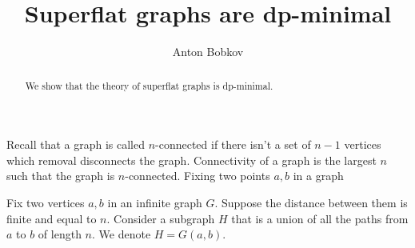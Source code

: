 \documentclass{amsart}
\begin{document}
\title{Superflat graphs are dp-minimal}
\author{Anton Bobkov}

\begin{abstract}
	We show that the theory of superflat graphs is dp-minimal.
\end{abstract}

\maketitle

Recall that a graph is called $n$-connected if there isn't a set of $n-1$ vertices which removal disconnects the graph. Connectivity of a graph is the largest $n$ such that the graph is $n$-connected. Fixing two points $a,b$ in a graph

\begin{Definition}
	Fix two vertices $a,b$ in an infinite graph $G$. Suppose the distance between them is finite and equal to $n$. Consider a subgraph $H$ that is a union of all the paths from $a$ to $b$ of length $n$. We denote $H = G(a,b)$.
\end{Definition}
\end{document}
